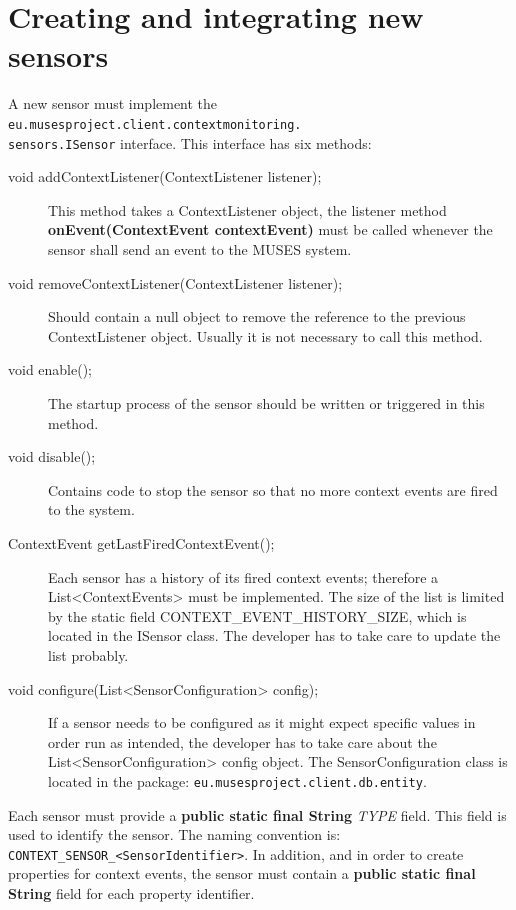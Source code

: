 \documentclass[a4paper,11pt]{book}
\begin{document}
\chapter{Creating and integrating new sensors}
\label{ch:sensors}

A new sensor must implement the \texttt{eu.musesproject.client.contextmonitoring.\\sensors.ISensor} interface. This interface has six methods:

\begin{description}
  \item[void addContextListener(ContextListener listener);] This method takes a ContextListener object, the listener method \textbf{onEvent(ContextEvent contextEvent)} must be called whenever the sensor shall send an event to the MUSES system.
  \item[void removeContextListener(ContextListener listener);] Should contain a null object to remove the reference to the previous ContextListener object. Usually it is not necessary to call this method.
  \item[void enable();] The startup process of the sensor should be written or triggered in this method.
  \item[void disable();] Contains code to stop the sensor so that no more context events are fired to the system.
  \item[ContextEvent getLastFiredContextEvent();] Each sensor has a history of its fired context events; therefore a List<ContextEvents> must be implemented. The size of the list is limited by the static field CONTEXT\_EVENT\_HISTORY\_SIZE, which is located in the ISensor class. The developer has to take care to update the list probably.
  \item[void configure(List<SensorConfiguration> config);] If a sensor needs to be configured as it might expect specific values in order run as intended, the developer has to take care about the List<SensorConfiguration> config object. The SensorConfiguration class is located in the package: \texttt{eu.musesproject.client.db.entity}.
\end{description}

Each sensor must provide a \textbf{public static final String} \textit{TYPE} field. This field is used to identify the sensor. The naming convention is:\\\texttt{CONTEXT\_SENSOR\_<SensorIdentifier>}.
In addition, and in order to create properties for context events, the sensor must contain a \textbf{public static final String} field for each property identifier.
\end{document}
